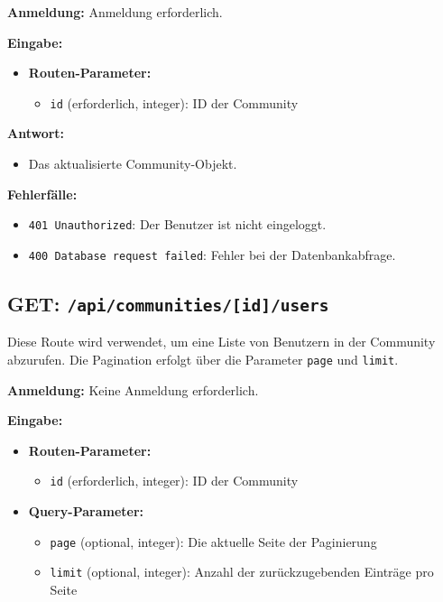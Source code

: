 \documentclass[a4paper,12pt]{article}
\begin{document}
\textbf{Anmeldung:} Anmeldung erforderlich.

\textbf{Eingabe:}
\begin{itemize}
    \item \textbf{Routen-Parameter:}
    \begin{itemize}
        \item \texttt{id} (erforderlich, integer):
            ID der Community
    \end{itemize}
\end{itemize}

\textbf{Antwort:}
\begin{itemize}
    \item Das aktualisierte Community-Objekt.
\end{itemize}

\textbf{Fehlerfälle:}
\begin{itemize}
    \item \texttt{401 Unauthorized}:
        Der Benutzer ist nicht eingeloggt.
    \item \texttt{400 Database request failed}:
        Fehler bei der Datenbankabfrage.
\end{itemize}

\subsection{GET: \texttt{/api/communities/[id]/users}}

Diese Route wird verwendet, um eine Liste von Benutzern in der Community
abzurufen. Die Pagination erfolgt über die Parameter \texttt{page} und
\texttt{limit}.

\textbf{Anmeldung:} Keine Anmeldung erforderlich.

\textbf{Eingabe:}
\begin{itemize}
    \item \textbf{Routen-Parameter:}
    \begin{itemize}
        \item \texttt{id} (erforderlich, integer):
            ID der Community
    \end{itemize}
    \item \textbf{Query-Parameter:}
    \begin{itemize}
        \item \texttt{page} (optional, integer):
            Die aktuelle Seite der Paginierung
        \item \texttt{limit} (optional, integer):
            Anzahl der zurückzugebenden Einträge pro Seite
    \end{itemize}
\end{itemize}
\end{document}
